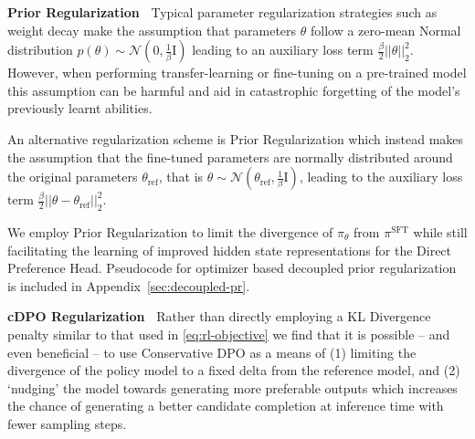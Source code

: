 \textbf{Prior Regularization\ }
Typical parameter regularization strategies such as weight decay make the assumption that parameters $\theta$ follow a zero-mean Normal distribution $p(\theta) \sim \mathcal{N}(0,\tfrac{1}{\beta}\text{I})$ leading to an auxiliary loss term $\tfrac{\beta}{2}||\theta||^2_2$. However, when performing transfer-learning or fine-tuning on a pre-trained model this assumption can be harmful and aid in catastrophic forgetting of the model's previously learnt abilities.

An alternative regularization scheme is Prior Regularization \cite{CHELBA2006382, daumé2009frustratingly, grachten2019strategies} which instead makes the assumption that the fine-tuned parameters are normally distributed around the original parameters $\theta_{\text{ref}}$, that is $\theta \sim \mathcal{N}(\theta_{\text{ref}},\tfrac{1}{\beta}\text{I})$, leading to the auxiliary loss term $\tfrac{\beta}{2}||\theta-\theta_{\text{ref}}||^2_2$.

We employ Prior Regularization to limit the divergence of $\pi_\theta$ from $\pi^{\text{SFT}}$ while still facilitating the learning of improved hidden state representations for the Direct Preference Head. Pseudocode for optimizer based decoupled prior regularization is included in Appendix~\ref{sec:decoupled-pr}.


\textbf{cDPO Regularization\ }
Rather than directly employing a KL Divergence penalty similar to that used in \eqref{eq:rl-objective} we find that it is possible -- and even beneficial -- to use Conservative DPO as a means of (1) limiting the divergence of the policy model to a fixed delta from the reference model, and (2) `nudging' the model towards generating more preferable outputs which increases the chance of generating a better candidate completion at inference time with fewer sampling steps.

